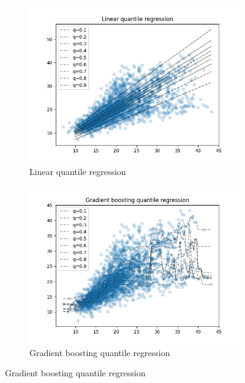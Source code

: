 \begin{figure}
    \begin{subfigure}[b]{0.5\linewidth}
      \centering
      \includegraphics[width=1.1\textwidth]{images/melbourne_linear_quantile_regression.png} 
      \caption{Linear quantile regression} 
      \label{fig:melbourne_linear_quantile_regression} 
      \vspace{4ex}
    \end{subfigure}%
    \begin{subfigure}[b]{0.5\linewidth}
      \centering
      \includegraphics[width=1.1\textwidth]{images/melbourne_gradient_boosting_quantile_regression.png} 
      \caption{Gradient boosting quantile regression} 
      \label{fig:melbourne_gradient_boosting_quantile_regression} 

\end{subfigure}
\end{figure}
